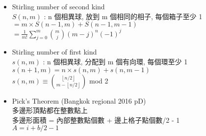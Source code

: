 \begin{itemize}
\item Stirling number of second kind \\
	\( S(n,m)\) :  n 個相異球, 放到 m 個相同的相子, 每個箱子至少 1 \\
	\( = m \times S(n-1,m) + S(n-1,m-1) \) \\
	\( = \frac{1}{m!} \sum_{j=0}^{m} \binom{m}{j} (m-j)^n (-1)^j \)
\item Stirling number of first kind \\
	\( s(n,m)\) :  n 個相異球, 分配到 m 個有向環, 每個環至少 1 \\
	\( s(n+1,m) = n \times s(n,m) + s(n,m-1) \) \\
	\( s(n,m) \equiv \binom{ \left \lfloor n/2 \right \rfloor }{ m-\left \lfloor n/2 \right \rfloor }\) mod 2
\item Pick's Theorem (Bangkok regional 2016 pD) \\
	多邊形頂點都在整數點上 \\
    多邊形面積 = 內部整數點個數 + 邊上格子點個數/2 - 1\\
	\( A = i + b/2 -1 \)
\end{itemize}
